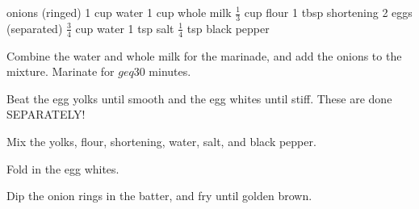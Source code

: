 \dishtype{\side}
\dishother{\vegetarian}
\begin{ingreds}
     onions (ringed)
        1 cup water
        1 cup whole milk
    \columnbreak{}
    $\frac{1}{3}$ cup flour
        1 tbsp shortening
        2 eggs (separated)
        $\frac{3}{4}$ cup water
        1 tsp salt
        $\frac{1}{4}$ tsp black pepper
\end{ingreds}
\begin{method}
    Combine the water and whole milk for the marinade, and add the onions to the mixture. Marinate for $geq$30 minutes.\par
    Beat the egg yolks until smooth and the egg whites until stiff. These are done SEPARATELY!\@\par
    Mix the yolks, flour, shortening, water, salt, and black pepper.\par
    Fold in the egg whites.\par
    Dip the onion rings in the batter, and fry until golden brown.
\end{method}